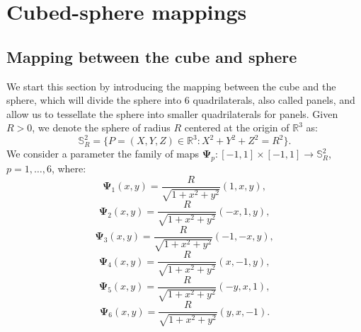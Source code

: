 \newpage
\section{Cubed-sphere mappings}
\label{cs-mappings}
\subsection{Mapping between the cube and sphere}
\label{equidistant-cs}
We start this section by introducing the mapping between the cube and the sphere, which will divide the sphere into 6 quadrilaterals, also called panels, and allow us to tessellate the sphere into smaller quadrilaterals for panels.
Given $R>0$, we denote the sphere of radius $R$ 
centered at the origin of  $\mathbb{R}^3$ as:
\begin{equation*}
	\mathbb{S}^2_R = \{ P = (X,Y,Z) \in \mathbb{R}^3: X^2 + Y^2 + Z^2 = R^2\}.
\end{equation*}
We consider a parameter %
the family of maps
$\boldsymbol{\Psi}_{p}: [-1,1] \times [-1,1] \to \mathbb{S}^2_R$, $p=1, \ldots, 6$,
where:
\begin{equation*}
	\boldsymbol{\Psi}_{1}(x,y) = \frac{R}{\sqrt{1 + x^2 + y^2}}(1, x, y), 
\end{equation*}
\begin{equation*}
	\boldsymbol{\Psi}_{2}(x,y) = \frac{R}{\sqrt{1 + x^2 + y^2}}(-x, 1, y), 
\end{equation*}
\begin{equation*}
	\boldsymbol{\Psi}_{3}(x,y) = \frac{R}{\sqrt{1 + x^2 + y^2}}(-1, -x, y), 
\end{equation*}
\begin{equation*}
	\boldsymbol{\Psi}_{4}(x,y) = \frac{R}{\sqrt{1 + x^2 + y^2}}(x, -1, y), 
\end{equation*}
\begin{equation*}
	\boldsymbol{\Psi}_{5}(x,y) = \frac{R}{\sqrt{1 + x^2 + y^2}}(-y, x, 1), 
\end{equation*}
\begin{equation*}
	\boldsymbol{\Psi}_{6}(x,y) = \frac{R}{\sqrt{1 + x^2 + y^2}}(y, x, -1).
\end{equation*}


